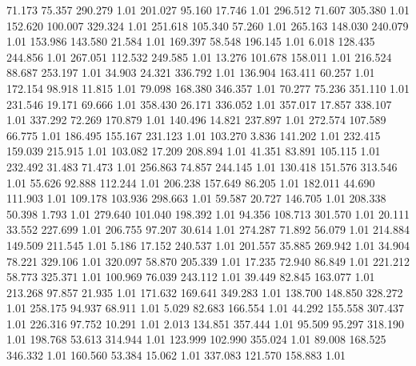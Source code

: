   71.173   75.357  290.279         1.01
 201.027   95.160   17.746         1.01
 296.512   71.607  305.380         1.01
 152.620  100.007  329.324         1.01
 251.618  105.340   57.260         1.01
 265.163  148.030  240.079         1.01
 153.986  143.580   21.584         1.01
 169.397   58.548  196.145         1.01
   6.018  128.435  244.856         1.01
 267.051  112.532  249.585         1.01
  13.276  101.678  158.011         1.01
 216.524   88.687  253.197         1.01
  34.903   24.321  336.792         1.01
 136.904  163.411   60.257         1.01
 172.154   98.918   11.815         1.01
  79.098  168.380  346.357         1.01
  70.277   75.236  351.110         1.01
 231.546   19.171   69.666         1.01
 358.430   26.171  336.052         1.01
 357.017   17.857  338.107         1.01
 337.292   72.269  170.879         1.01
 140.496   14.821  237.897         1.01
 272.574  107.589   66.775         1.01
 186.495  155.167  231.123         1.01
 103.270    3.836  141.202         1.01
 232.415  159.039  215.915         1.01
 103.082   17.209  208.894         1.01
  41.351   83.891  105.115         1.01
 232.492   31.483   71.473         1.01
 256.863   74.857  244.145         1.01
 130.418  151.576  313.546         1.01
  55.626   92.888  112.244         1.01
 206.238  157.649   86.205         1.01
 182.011   44.690  111.903         1.01
 109.178  103.936  298.663         1.01
  59.587   20.727  146.705         1.01
 208.338   50.398    1.793         1.01
 279.640  101.040  198.392         1.01
  94.356  108.713  301.570         1.01
  20.111   33.552  227.699         1.01
 206.755   97.207   30.614         1.01
 274.287   71.892   56.079         1.01
 214.884  149.509  211.545         1.01
   5.186   17.152  240.537         1.01
 201.557   35.885  269.942         1.01
  34.904   78.221  329.106         1.01
 320.097   58.870  205.339         1.01
  17.235   72.940   86.849         1.01
 221.212   58.773  325.371         1.01
 100.969   76.039  243.112         1.01
  39.449   82.845  163.077         1.01
 213.268   97.857   21.935         1.01
 171.632  169.641  349.283         1.01
 138.700  148.850  328.272         1.01
 258.175   94.937   68.911         1.01
   5.029   82.683  166.554         1.01
  44.292  155.558  307.437         1.01
 226.316   97.752   10.291         1.01
   2.013  134.851  357.444         1.01
  95.509   95.297  318.190         1.01
 198.768   53.613  314.944         1.01
 123.999  102.990  355.024         1.01
  89.008  168.525  346.332         1.01
 160.560   53.384   15.062         1.01
 337.083  121.570  158.883         1.01
